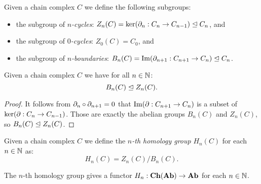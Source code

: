\begin{definition}
	Given a chain complex $C$ we define the following subgroups:
	\begin{itemize}
		\item the subgroup of \emph{$n$-cycles}: $Z_n(C) = \ker(\partial_n: C_n \to C_{n-1}) \trianglelefteq C_n$, and
		\item the subgroup of \emph{$0$-cycles}: $Z_0(C) = C_0$, and
		\item the subgroup of \emph{$n$-boundaries}: $B_n(C) = \operatorname{Im}(\partial_{n+1}: C_{n+1} \to C_n) \trianglelefteq C_n$.
	\end{itemize}
\end{definition}
\begin{lemma}
	Given a chain complex $C$ we have for all $n \in \mathbb{N}$:
	$$ B_n(C) \trianglelefteq Z_n(C).$$
\end{lemma}
\begin{proof}
	It follows from $\partial_n \circ \partial_{n+1} = 0$ that $\operatorname{Im}(\partial: C_{n+1} \to C_n)$ is a subset of $\ker(\partial: C_n \to C_{n-1})$. Those are exactly the abelian groups $B_n(C)$ and $Z_n(C)$, so $ B_n(C) \trianglelefteq Z_n(C) $.
\end{proof}
\begin{definition}
	Given a chain complex $C$ we define the \emph{$n$-th homology group} $H_n(C)$ for each $n \in \mathbb{N}$ as:
	$$ H_n(C) = Z_n(C) / B_n(C).$$
\end{definition}
\begin{lemma}
	The $n$-th homology group gives a functor $H_n : \mathbf{Ch}(\mathbf{Ab}) \to \mathbf{Ab}$ for each $n \in \mathbb{N}$.
\end{lemma}
